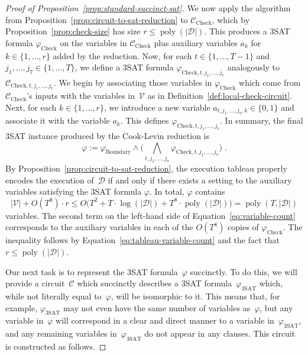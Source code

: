 \documentclass[11pt]{article}
\theoremstyle{definition}
\DeclareMathOperator{\poly}{poly}
\newcommand{\decider}{\mathcal{D}}
\newcommand{\circuit}{\mathcal{C}}
\begin{document}
\begin{proof}[Proof of Proposition~\ref{prop:standard-succinct-sat}]
We now apply the algorithm from Proposition~\ref{prop:circuit-to-sat-reduction}
to $\circuit_{\mathrm{Check}}$, which by Proposition~\ref{prop:check-size} has
size $r \leq \poly(|\decider|)$.
This produces a 3SAT formula $\varphi_{\mathrm{Check}}$ on the variables in
$\circuit_{\mathrm{Check}}$ plus auxiliary variables $a_k$ for $k \in \{1,
\ldots, r\}$ added by the reduction.
Now, for each $t \in \{1, \ldots, T-1\}$ and $j_1, \ldots, j_7 \in \{1, \ldots,
T\}$, we define a 3SAT formula $\varphi_{\mathrm{Check}, t, j_1, \ldots, j_7}$
analogously to $\circuit_{\mathrm{Check}, t, j_1, \ldots, j_7}$.
We begin by associating those variables in $\varphi_{\mathrm{Check}}$ which come
from $\circuit_{\mathrm{Check}}$'s inputs with the variables in~$\mathcal{V}$ as
in Definition~\ref{def:local-check-circuit}.
Next, for each $k \in \{1, \ldots, r\}$, we introduce a new variable $a_{t, j_1,
  \ldots, j_7, k} \in \{0, 1\}$ and associate it with the variable $a_k$.
This defines $\varphi_{\mathrm{Check}, t, j_1, \ldots, j_7}$.
In summary, the final 3SAT instance produced by the Cook-Levin reduction is
\begin{equation}\label{eq:cook-levin-3sat}
  \varphi:= \varphi_{\mathrm{Boundary}} \land \big(\bigwedge_{t, j_1, \ldots, j_7}
  \varphi_{\mathrm{Check}, t, j_1, \ldots, j_7}\big)\;.
\end{equation}
By Proposition~\ref{prop:circuit-to-sat-reduction}, the execution tableau
properly encodes the execution of~$\decider$ if and only if there exists a
setting to the auxiliary variables satisfying the 3SAT formula $\varphi$.
In total, $\varphi$ contains
\begin{equation}\label{eq:variable-count}
|\mathcal{V}| + O(T^8) \cdot r
\leq O\big(T^2 + T \cdot \log(|\decider|)
    + T^8\cdot \poly(|\decider|)\big)
 = \poly(T, |\decider|)
\end{equation}
variables.
The second term on the left-hand side of Equation~\eqref{eq:variable-count}
corresponds to the auxiliary variables in each of the $O(T^8)$ copies of
$\varphi_{\mathrm{Check}}$.
The inequality follows by Equation~\eqref{eq:tableau-variable-count} and the
fact that $r \leq \poly(|\decider|)$.
  
Our next task is to represent the 3SAT formula~$\varphi$ succinctly.
To do this, we will provide a circuit~$\circuit$ which succinctly describes a
3SAT formula~$\varphi_{\mathrm{3SAT}}$ which, while not literally equal
to~$\varphi$, will be isomorphic to it.
This means that, for example, $\varphi_{\mathrm{3SAT}}$ may not even have the
same number of variables as~$\varphi$, but any variable in~$\varphi$ will
correspond in a clear and direct manner to a variable
in~$\varphi_{\mathrm{3SAT}}$, and any remaining variables
in~$\varphi_{\mathrm{3SAT}}$ do not appear in any clauses.
This circuit is constructed as follows.


\end{proof}
\end{document}
